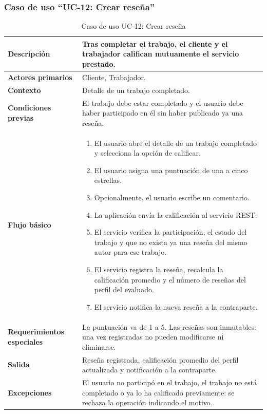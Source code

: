 \documentclass[doc,12pt,a4paper]{apa7}
\begin{document}
\subsubsection{Caso de uso ``UC-12: Crear reseña''}

\begin{longtable}{|P{3.3cm}|L{11.2cm}|}
\caption{Caso de uso UC-12: Crear reseña}\\
\hline
\textbf{Descripción} & Tras completar el trabajo, el cliente y el trabajador califican mutuamente el servicio prestado. \\ \hline
\textbf{Actores primarios} & Cliente, Trabajador. \\ \hline
\textbf{Contexto} & Detalle de un trabajo completado. \\ \hline
\textbf{Condiciones previas} & El trabajo debe estar completado y el usuario debe haber participado en él sin haber publicado ya una reseña. \\ \hline
\textbf{Flujo básico} &
\begin{enumerate}
    \item El usuario abre el detalle de un trabajo completado y selecciona la opción de calificar.
    \item El usuario asigna una puntuación de una a cinco estrellas.
    \item Opcionalmente, el usuario escribe un comentario.
    \item La aplicación envía la calificación al servicio REST.
    \item El servicio verifica la participación, el estado del trabajo y que no exista ya una reseña del mismo autor para ese trabajo.
    \item El servicio registra la reseña, recalcula la calificación promedio y el número de reseñas del perfil del evaluado.
    \item El servicio notifica la nueva reseña a la contraparte.
\end{enumerate} \\ \hline
\textbf{Requerimientos especiales} & La puntuación va de 1 a 5. Las reseñas son inmutables: una vez registradas no pueden modificarse ni eliminarse. \\ \hline
\textbf{Salida} & Reseña registrada, calificación promedio del perfil actualizada y notificación a la contraparte. \\ \hline
\textbf{Excepciones} & El usuario no participó en el trabajo, el trabajo no está completado o ya lo ha calificado previamente: se rechaza la operación indicando el motivo. \\ \hline
\end{longtable}
\end{document}
